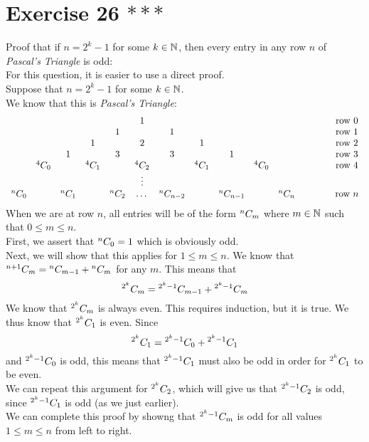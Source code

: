 \documentclass[12pt]{article}
\begin{document}
    \section*{Exercise 26 $***$}
    Proof that if $n = 2^k - 1$ for some $k \in \mathbb{N}$,
    then every entry in any row $n$
    of \textit{Pascal's Triangle} is odd: \\
    For this question, it is easier to use a direct proof. \\
    Suppose that $n = 2^k - 1$ for some $k \in \mathbb{N}$. \\
    We know that this is \textit{Pascal's Triangle}:
    \[
    \begin{array}{ccccccccccccc}
    &   &   &   &   & 1 &   &   &   &   &   &   &  \qquad \text{ row } 0 \\
    &   &   &   & 1 &   & 1 &   &   &   &   &   & \qquad \text{ row } 1  \\
    &   &   & 1 &   & 2 &   & 1 &   &   &   &   & \qquad \text{ row } 2  \\
    &   & 1 &   & 3 &   & 3 &   & 1 &   &   &   & \qquad \text{ row } 3 \\
    & {}^{4}C_{0} &   & {}^{4}C_{1} &   & {}^{4}C_{2} &   & 
    {}^{4}C_{1} &   & {}^{4}C_{0} &   &   & \qquad \text{ row } 4 \\
    &   &  &   &  & \vdots &  &  &  &   &  &   &   \\
    {}^{n}C_{0} &   & {}^{n}C_{1} &   & {}^{n}C_{2} & \dots &
    {}^{n}C_{n-2} &  & {}^{n}C_{n-1} &   & {}^{n}C_{n} &   & 
    \qquad \text{ row } n \\
    \end{array}
    \]
    When we are at row $n$,
    all entries will be of the form ${}^{n}C_{m}$
    where $m \in \mathbb{N}$ such that $0 \leqslant m \leqslant n$. \\
    First, we assert that ${}^{n}C_{0} = 1$
    which is obviously odd. \\
    Next, we will show that this applies
    for $1 \leqslant m \leqslant n$.
    We know that ${}^{n+1}C_{m} = {}^{n}C_{m-1} + {}^{n}C_{m}$
    for any $m$.
    This means that
    \[ {}^{2^k}C_{m} = {}^{2^k-1}C_{m-1} + {}^{2^k-1}C_{m} \]
    We know that ${}^{2^k}C_{m}$ is always even.
    This requires induction,
    but it is true.
    We thus know that ${}^{2^k}C_{1}$ is even.
    Since 
    \[ {}^{2^k}C_{1} = {}^{2^k-1}C_{0} + {}^{2^k-1}C_{1} \]
    and ${}^{2^k-1}C_{0}$ is odd,
    this means that ${}^{2^k-1}C_{1}$ must also be odd
    in order for ${}^{2^k}C_{1}$ to be even. \\
    We can repeat this argument for ${}^{2^k}C_{2}$,
    which will give us that ${}^{2^k-1}C_{2}$ is odd,
    since ${}^{2^k-1}C_{1}$ is odd (as we just earlier). \\
    We can complete this proof by showng that ${}^{2^k-1}C_{m}$
    is odd for all values $1 \leqslant m \leqslant n$
    from left to right. \\
\end{document}
